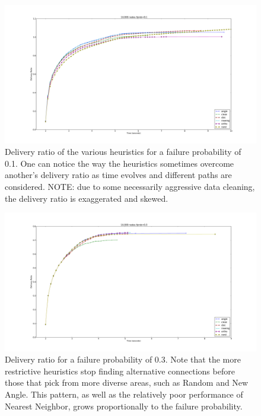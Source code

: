 \documentclass[conference]{IEEEtran}
\begin{document}
\begin{figure}
\includegraphics[width=6.0in]{../../images/plots/fprob1}
\vspace{-20pt}
\caption{Delivery ratio of the various heuristics for a failure probability of 0.1.
One can notice the way the heuristics sometimes overcome another's delivery ratio as time evolves and different paths are considered.
NOTE: due to some necessarily aggressive data cleaning, the delivery ratio is exaggerated and skewed.}
\end{figure}
\begin{figure}
\includegraphics[width=6.0in]{../../images/plots/fprob3}
\vspace{-20pt}
\caption{Delivery ratio for a failure probability of 0.3.
Note that the more restrictive heuristics stop finding alternative connections before those that pick from more diverse areas, such as Random and New Angle.
This pattern, as well as the relatively poor performance of Nearest Neighbor, grows proportionally to the failure probability.}
\end{figure}

\end{document}
